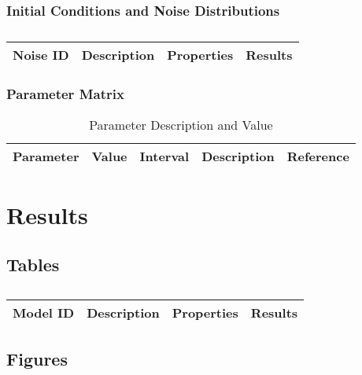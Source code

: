 \subsubsection{Initial Conditions and Noise Distributions}

\centering	
\begin{table}[H]\tiny
	\caption{}	
	\begin{tabular}{rp{1cm}|p{4cm}|l}
		\hline	
		Noise ID & Description & Properties & Results \\
		\hline 
		\hline 
	\end{tabular}
\end{table}

\subsubsection{Parameter Matrix}
\vspace{4pt}
\centering
\begin{table}[h]\footnotesize
	\caption{Parameter Description and Value}
	\begin{tabular}{rllp{2cm}l}
		\hline	
		Parameter & Value & Interval & Description & Reference \\
		\hline 
	\end{tabular}	
\end{table}


\section{Results}

\subsection{Tables}

\centering	
\begin{table}[H]\tiny
	\caption{}	
	\begin{tabular}{rp{1cm}|p{4cm}|l}
		\hline	
		Model ID & Description & Properties & Results \\
		\hline 
		\hline 
	\end{tabular}
\end{table}

\subsection{Figures}

